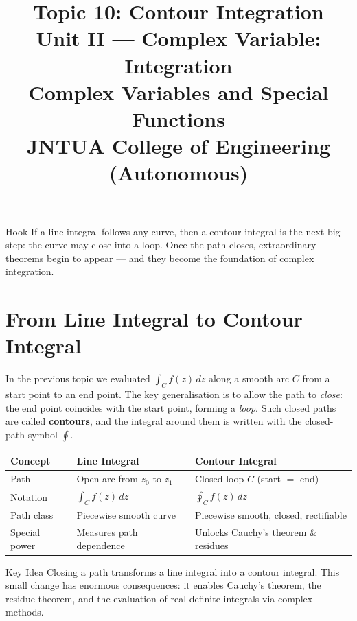 \documentclass[12pt,a4paper]{article}
\title{\textbf{Topic 10: Contour Integration}\\[6pt]
       \large Unit II --- Complex Variable: Integration\\[4pt]
       \normalsize Complex Variables and Special Functions\\
       JNTUA College of Engineering (Autonomous)}
\author{}
\date{}
\begin{document}
\maketitle
\tableofcontents
\newpage

\begin{curiositybox}{Hook}
If a line integral follows any curve, then a contour integral is the next big step:
the curve may close into a loop. Once the path closes, extraordinary theorems begin
to appear --- and they become the foundation of complex integration.
\end{curiositybox}

\section{From Line Integral to Contour Integral}

In the previous topic we evaluated \(\int_C f(z)\,dz\) along a smooth arc $C$
from a start point to an end point. The key generalisation is to allow the path
to \emph{close}: the end point coincides with the start point, forming a
\emph{loop}. Such closed paths are called \textbf{contours}, and the integral
around them is written with the closed-path symbol $\oint$.

\begin{center}
\begin{tabular}{@{}lll@{}}
\toprule
Concept & Line Integral & Contour Integral \\
\midrule
Path & Open arc from $z_0$ to $z_1$ & Closed loop $C$ (start $=$ end) \\
Notation & $\displaystyle\int_C f(z)\,dz$ & $\displaystyle\oint_C f(z)\,dz$ \\
Path class & Piecewise smooth curve & Piecewise smooth, closed, rectifiable \\
Special power & Measures path dependence & Unlocks Cauchy's theorem \& residues \\
\bottomrule
\end{tabular}
\end{center}

\begin{learnbox}{Key Idea}
Closing a path transforms a line integral into a contour integral. This small
change has enormous consequences: it enables Cauchy's theorem, the residue
theorem, and the evaluation of real definite integrals via complex methods.
\end{learnbox}
\end{document}
